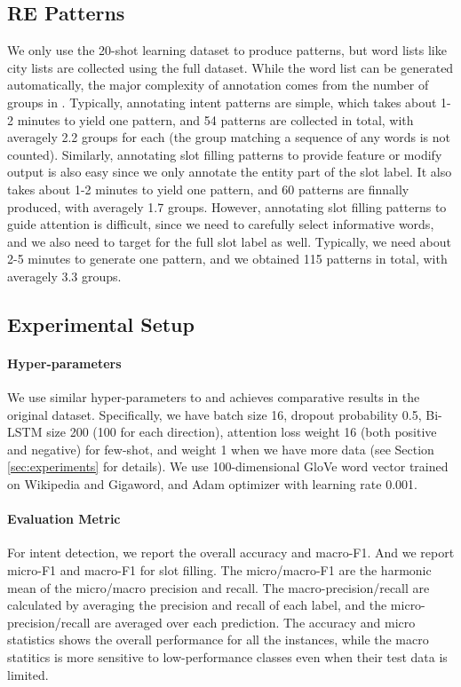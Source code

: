 \subsection{RE Patterns}
\label{re_in_exp}
We only use the 20-shot learning dataset to produce \RE patterns, but word lists like city lists are collected using the full dataset. 
While the word list can be generated automatically, the major complexity of annotation comes from the number of groups in \RE.
Typically, annotating intent patterns are simple, which takes about 1-2 minutes to yield one pattern, and 54 patterns are collected in total, with averagely 2.2 groups for each \RE (the group matching a sequence of any words is not counted). 
Similarly, annotating slot filling patterns to provide feature or modify output is also easy since we only annotate the entity part of the slot label. It also takes about 1-2 minutes to yield one pattern, and 60 patterns are finnally produced, with averagely 1.7 groups.
However, annotating slot filling patterns to guide attention is difficult, since we need to carefully select informative words, and we also need to target for the full slot label as well. Typically, we need about 2-5 minutes to generate one pattern, and we obtained 115 patterns in total, with averagely 3.3 groups.


\subsection{Experimental Setup}
\paragraph{Hyper-parameters}
We use similar hyper-parameters to \cite{liu2016attention} and achieves comparative results in the original dataset. Specifically, we have batch size 16, dropout probability 0.5, Bi-LSTM size 200 (100 for each direction), attention loss weight 16 (both positive and negative) for few-shot, and weight 1 when we have more data (see Section \ref{sec:experiments} for details). We use 100-dimensional GloVe \cite{pennington2014glove} word vector trained on Wikipedia and Gigaword, and Adam optimizer \cite{kingma2014adam} with learning rate 0.001.

\paragraph{Evaluation Metric}
For intent detection, we report the overall accuracy and macro-F1. And we report micro-F1 and macro-F1 for slot filling.
The micro/macro-F1 are the harmonic mean of the micro/macro precision and recall.
The macro-precision/recall are calculated by averaging the precision and recall of each label, and the micro-precision/recall are averaged over each prediction. 
The accuracy and micro statistics shows the overall performance for all the instances, while the macro statitics is more sensitive to low-performance classes even when their test data is limited.

